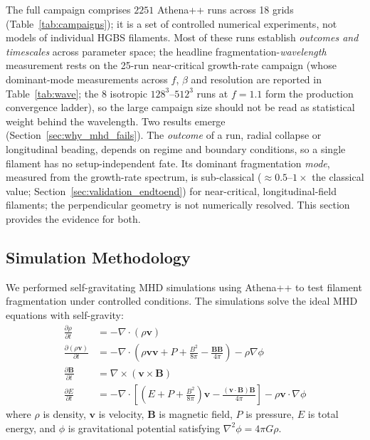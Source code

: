 \documentclass[usenatbib,twoside,twocolumn]{mnras}
\begin{document}
The full campaign comprises $2251$ Athena++ runs across 18 grids (Table~\ref{tab:campaigns}); it is a set of controlled numerical experiments, not models of individual HGBS filaments. Most of these runs establish \emph{outcomes and timescales} across parameter space; the headline fragmentation-\emph{wavelength} measurement rests on the 25-run near-critical growth-rate campaign (whose dominant-mode measurements across $f$, $\beta$ and resolution are reported in Table~\ref{tab:wave}; the 8 isotropic $128^3$--$512^3$ runs at $f=1.1$ form the production convergence ladder), so the large campaign size should not be read as statistical weight behind the wavelength. Two results emerge (Section~\ref{sec:why_mhd_fails}). The \emph{outcome} of a run, radial collapse or longitudinal beading, depends on regime and boundary conditions, so a single filament has no setup-independent fate. Its dominant fragmentation \emph{mode}, measured from the growth-rate spectrum, is sub-classical ($\approx0.5$--$1\times$ the classical value; Section~\ref{sec:validation_endtoend}) for near-critical, longitudinal-field filaments; the perpendicular geometry is not numerically resolved. This section provides the evidence for both.

\subsection{Simulation Methodology}

We performed self-gravitating MHD simulations using Athena++ \citep{Stone2020} to test filament fragmentation under controlled conditions. The simulations solve the ideal MHD equations with self-gravity:
\begin{align}
\frac{\partial \rho}{\partial t} &= -\nabla \cdot (\rho \mathbf{v}) \\
\frac{\partial (\rho \mathbf{v})}{\partial t} &= -\nabla \cdot \left(\rho \mathbf{v} \mathbf{v} + P + \frac{B^2}{8\pi} - \frac{\mathbf{B}\mathbf{B}}{4\pi}\right) - \rho \nabla \phi \\
\frac{\partial \mathbf{B}}{\partial t} &= \nabla \times (\mathbf{v} \times \mathbf{B}) \\
\frac{\partial E}{\partial t} &= -\nabla \cdot \left[(E + P + \frac{B^2}{8\pi})\mathbf{v} - \frac{(\mathbf{v} \cdot \mathbf{B})\mathbf{B}}{4\pi}\right] - \rho \mathbf{v} \cdot \nabla \phi
\end{align}
where $\rho$ is density, $\mathbf{v}$ is velocity, $\mathbf{B}$ is magnetic field, $P$ is pressure, $E$ is total energy, and $\phi$ is gravitational potential satisfying $\nabla^2 \phi = 4\pi G\rho$.
\end{document}
